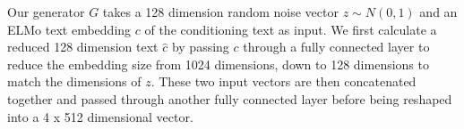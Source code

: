 Our generator $G$ takes a 128 dimension random noise vector $z \sim N(0, 1)$ and an ELMo text embedding $c$ of the conditioning text as input. We first calculate a reduced 128 dimension text  $\hat{c}$ by passing $c$ through a fully connected layer to reduce the embedding size from 1024 dimensions, down to 128 dimensions to match the dimensions of $z$. These two input vectors are then concatenated together and passed through another fully connected layer before being reshaped into a 4 x 512 dimensional vector.